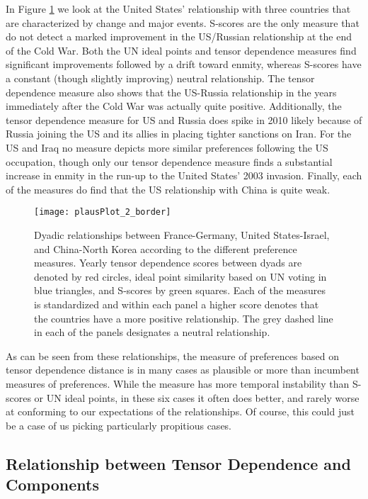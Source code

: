 In Figure \ref{unfriendly:dyads} we look at the United States' relationship with three countries that are characterized by change and major events. S-scores are the only measure that do not detect a marked improvement in the US/Russian relationship at the end of the Cold War. Both the UN ideal points and tensor dependence measures find significant improvements followed by a drift toward enmity, whereas S-scores have a constant (though slightly improving) neutral relationship. The tensor dependence measure also shows that the US-Russia relationship in the years immediately after the Cold War was actually quite positive. Additionally, the tensor dependence measure for US and Russia does spike in 2010 likely because of Russia joining the US and its allies in placing tighter sanctions on Iran. For the US and Iraq no measure depicts more similar preferences following the US occupation, though only our tensor dependence measure finds a substantial increase in enmity in the run-up to the United States' 2003 invasion. Finally, each of the measures do find that the US relationship with China is quite weak.

\begin{figure}
	\centering
	\texttt{[image: plausPlot\_2\_border]}
	\caption{Dyadic relationships between France-Germany, United States-Israel, and China-North Korea according to the different preference measures. Yearly tensor dependence scores between dyads are denoted by red circles, ideal point similarity based on UN voting in blue triangles, and S-scores by green squares. Each of the measures is standardized and within each panel a higher score denotes that the countries have a more positive relationship. The grey dashed line in each of the panels designates a neutral relationship.}
	\label{unfriendly:dyads}
\end{figure}

As can be seen from these relationships, the measure of preferences based on tensor dependence distance is in many cases as plausible or more than incumbent measures of preferences. While the measure has more temporal instability than S-scores or UN ideal points, in these six cases it often does better, and rarely worse at conforming to our expectations of the relationships. Of course, this could just be a case of us picking particularly propitious cases. 

\subsection*{Relationship between Tensor Dependence and Components}

